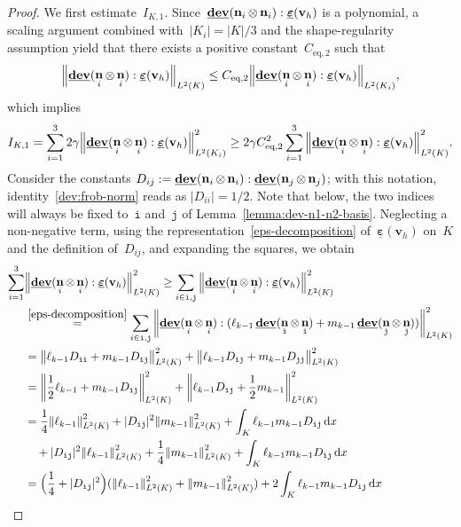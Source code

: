 \documentclass[a4paper,twoside,10pt]{article}
\theoremstyle{plain}
\theoremstyle{remark}
\theoremstyle{definition}
\numberwithin{equation}{section}
\numberwithin{figure}{section}
\newcommand{\Norm}[1]{{\left\|{#1} \right\|}}
\newcommand{\K}{K}
\newcommand{\vbfh}{\mathbf{v}_h}
\DeclareMathOperator{\dev}{\underline{\mathbf{dev}}}
\DeclareMathOperator{\norm}{\bf{n}}
\newcommand{\Ltwo}{L^2}
\newcommand{\dx}{\, \mathrm{d}x}
\newcommand{\epsbfun}{\underline{\boldsymbol{\varepsilon}}}
\newcommand{\lkmo}{\ell_{k-1}}
\newcommand{\mkmo}{m_{k-1}}
\newcommand{\Ki}{{\K_i}}
\newcommand{\itt}{\mathtt{i}}
\newcommand{\jtt}{\mathtt{j}}
\newcommand{\normi}{\norm_i}
\newcommand{\normj}{\norm_j}
\newcommand{\normitt}{\norm_{\itt}}
\newcommand{\normjtt}{\norm_{\jtt}}
\newcommand{\Ceqtwo}{C_{\text{eq},2}}
\newcommand{\IKone}{I_{\K,1}}
\begin{document}
\begin{proof}
We first estimate~$\IKone$.
Since~$\dev(\normi\otimes\normi):\epsbfun(\vbfh)$ is a polynomial,
a scaling argument combined with~$|\Ki|=|K|/3$
and the shape-regularity assumption
yield
that there exists a positive constant~$\Ceqtwo$ such that
\begin{equation*}
\Norm{\dev(\normi\otimes\normi):\epsbfun(\vbfh)}_{\Ltwo(\K)}
\leq \Ceqtwo \Norm{\dev(\normi\otimes\normi):\epsbfun(\vbfh)}_{\Ltwo(\Ki)},
\end{equation*}
which implies
\begin{equation} \label{IKone:first-estimate}
\IKone 
= \sum_{i=1}^3 2\gamma
  \Norm{\dev(\normi\otimes\normi):\epsbfun(\vbfh)}_{\Ltwo(\Ki)}^2
\geq 2\gamma\Ceqtwo^2 \sum_{i=1}^3  
  \Norm{\dev(\normi\otimes\normi):\epsbfun(\vbfh)}_{\Ltwo(\K)}^2.
\end{equation}
Consider the constants
$D_{ij} := \dev(\normi\otimes\normi):\dev(\normj\otimes\normj)$;
with this notation,
identity~\eqref{dev:frob-norm} reads as $|D_{ii}|=1/2$.
Note that below,
the two indices will always be fixed to~$\itt$ and~$\jtt$ of Lemma~\ref{lemma:dev-n1-n2-basis}.
Neglecting a non-negative term,
using the representation~\eqref{eps-decomposition} of~$\epsbfun(\vbfh)$ on~$\K$
and the definition of~$D_{ij}$,
and expanding the squares,
we obtain
\begin{equation} \label{sumdev-eps}
\begin{split}
\sum_{i = 1}^3&\Norm{\dev(\normi\otimes\normi):\epsbfun(\vbfh)}_{\Ltwo(\K)}^2 
\geq \sum_{i \in\itt,\jtt}\Norm{\dev(\normi\otimes\normi):\epsbfun(\vbfh)}_{\Ltwo(\K)}^2 \\
&\overset{\eqref{eps-decomposition}}{=} 
\sum_{i \in\itt,\jtt}\Norm{\dev(\normi\otimes\normi):(\lkmo\dev(\normitt\otimes\normitt)+\mkmo\dev(\normjtt\otimes\normjtt))}_{\Ltwo(\K)}^2 \\
&=\Norm{\lkmo D_{\itt\itt} + \mkmo D_{\itt\jtt}}_{\Ltwo(\K)}^2 
     + \Norm{\lkmo D_{\itt\jtt}+ \mkmo D_{\jtt\jtt}}_{\Ltwo(\K)}^2 \\
&=\Norm{\frac12\lkmo + \mkmo D_{\itt\jtt}}_{\Ltwo(\K)}^2 
     + \Norm{\lkmo D_{\itt\jtt}+ \frac12\mkmo}_{\Ltwo(\K)}^2 \\
&= \frac14\Norm{\lkmo}^2_{\Ltwo(\K)} + |D_{\itt\jtt}|^2\Norm{\mkmo}^2_{\Ltwo(\K)} + \int_\K\lkmo\mkmo D_{\itt\jtt}\dx \\
        &\quad +|D_{\itt\jtt}|^2\Norm{\lkmo}^2_{\Ltwo(\K)} + \frac14\Norm{\mkmo}^2_{\Ltwo(\K)} +\int_\K\lkmo\mkmo D_{\itt\jtt}\dx \\
&=\Big(\frac14+|D_{\itt\jtt}|^2\Big)(\Norm{\lkmo}^2_{\Ltwo(\K)} + \Norm{\mkmo}^2_{\Ltwo(\K)})+ 2\int_\K\lkmo\mkmo D_{\itt\jtt}\dx \\

\end{split}
\end{equation}
\end{proof}
\end{document}
